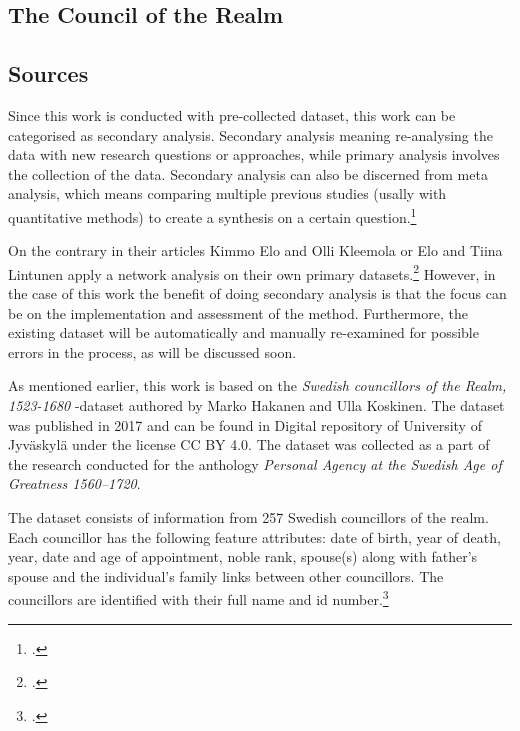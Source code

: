 \documentclass[a4paper,12pt]{article}
\begin{document}
\begin{onehalfspace}
\subsection{The Council of the Realm}

\subsection{Sources}
Since this work is conducted with pre-collected dataset, this work can be categorised as secondary analysis. Secondary analysis meaning re-analysing the data with new research questions or approaches, while primary analysis involves the collection of the data. Secondary analysis can also be discerned from meta analysis, which means comparing multiple previous studies (usally with quantitative methods) to create a synthesis on a certain question.\footcite[p. 4-5.]{meta-analysis} 

On the contrary in their articles Kimmo Elo and Olli Kleemola or Elo and Tiina Lintunen apply a network analysis on their own primary datasets.\footcites{eloAklee15}{LintunenAndElo2019} However, in the case of this work the benefit of doing secondary analysis is that the focus can be on the implementation and assessment of the method. Furthermore, the existing dataset will be automatically and manually re-examined for possible errors in the process, as will be discussed soon. 

As mentioned earlier, this work is based on the \textit{Swedish councillors of the Realm, 1523-1680} -dataset authored by Marko Hakanen and Ulla Koskinen. The dataset was published in 2017 and can be found in Digital repository of University of Jyväskylä under the license CC BY 4.0. The dataset was collected as a part of the research conducted for the anthology \textit{Personal Agency at the Swedish Age of Greatness 1560–1720}.

The dataset consists of information from 257 Swedish councillors of the realm. Each councillor has the following feature attributes: date of birth, year of death, year, date and age of appointment, noble rank, spouse(s) along with father's spouse and the individual's family links between other councillors. The councillors are identified with their full name and id number.\footcites[p. 48.]{HakanenAKoskinen2017}{councillorsDS}


\end{onehalfspace}
\end{document}
